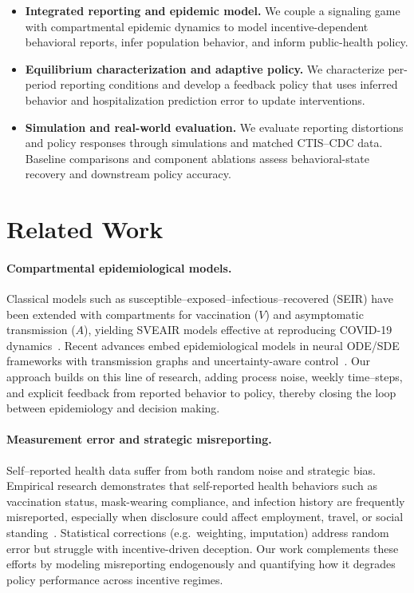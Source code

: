 \documentclass[sigconf,review]{acmart}
\begin{document}

\begin{itemize}
    \item \textbf{Integrated reporting and epidemic model.}
    We couple a signaling game with compartmental epidemic
    dynamics to model incentive-dependent behavioral reports, infer population behavior, and inform public-health policy.

    \item \textbf{Equilibrium characterization and adaptive policy.}
    We characterize per-period reporting conditions and develop a feedback policy that uses inferred behavior and hospitalization prediction error to update interventions.

    \item \textbf{Simulation and real-world evaluation.}
    We evaluate reporting distortions and policy responses
    through simulations and matched CTIS--CDC data.
    Baseline comparisons and component ablations assess
    behavioral-state recovery and downstream policy accuracy.
\end{itemize}

\section{Related Work}
\paragraph{Compartmental epidemiological models.} Classical models such as susceptible--exposed--infectious--recovered (SEIR) have been extended with compartments for vaccination ($V$) and asymptomatic transmission ($A$), yielding SVEAIR models effective at reproducing COVID-19 dynamics~\cite{ChoiJTB2020}.
Recent advances embed epidemiological models in neural ODE/SDE frameworks with transmission graphs and uncertainty-aware control~\cite{thiagarajan2022machine,EARTH2025,nSDE2025}.
Our approach builds on this line of research, adding process noise, weekly time–steps, and explicit feedback from reported behavior to policy, thereby closing the loop between epidemiology and decision making.

\paragraph{Measurement error and strategic misreporting.}
Self–reported health data suffer from both random noise and strategic bias.  
Empirical research demonstrates that self-reported health behaviors such as vaccination status, mask-wearing compliance, and infection history are frequently misreported, especially when disclosure could affect employment, travel, or social standing~\cite{Battaglia1997,Merrell2024}.
Statistical corrections (e.g.\ weighting, imputation) address random error but struggle with incentive-driven deception. Our work complements these efforts by modeling misreporting endogenously and quantifying how it degrades policy performance across incentive regimes.
\end{document}
